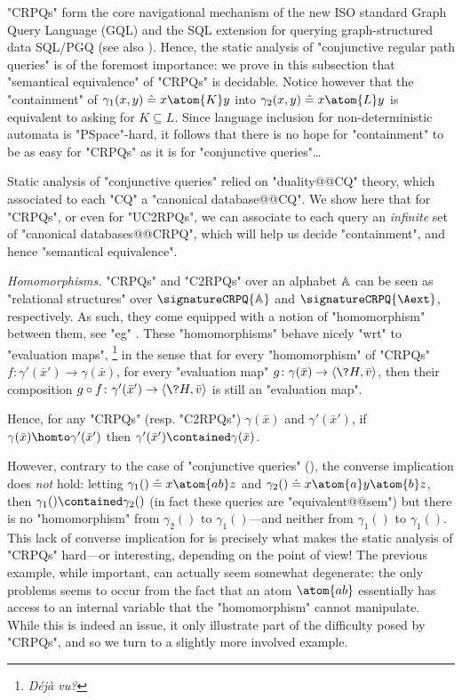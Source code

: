 "CRPQs" form the core navigational mechanism of the new ISO standard Graph Query Language (GQL) \cite{ISO2024GQL} and the SQL extension for querying graph-structured data SQL/PGQ \cite{ISO2023PGQ} (see also \cite{FrancisEtal2023GQL,FrancisEtal2023GPC}).
Hence, the static analysis of "conjunctive regular path queries" is of the foremost
importance: we prove in this subsection that "semantical equivalence" of "CRPQs" is decidable.
Notice however that the "containment" of $\gamma_1(x,y) \defeq x \atom{K} y$
into $\gamma_2(x,y) \defeq x \atom{L} y$ is equivalent to asking for $K \subseteq L$.
Since language inclusion for non-deterministic automata is "PSpace"-hard, it follows
that there is no hope for "containment" to be as easy for "CRPQs" as it is for "conjunctive queries"…

Static analysis of "conjunctive queries" relied on "duality@@CQ" theory,
which associated to each "CQ" a "canonical database@@CQ". 
We show here that for "CRPQs", or even for "UC2RPQs", we can associate
to each query an \emph{infinite} set of "canonical databases@@CRPQ", which will help us
decide "containment", and hence "semantical equivalence".

\emph{Homomorphisms.} "CRPQs" and "C2RPQs" over an alphabet $\mathbb{A}$
can be seen as "relational structures" over $\signatureCRPQ{\A}$ and $\signatureCRPQ{\Aext}$,
respectively. As such, they come equipped with a notion of "homomorphism" between them,
see "eg" . These "homomorphisms" behave nicely "wrt" to "evaluation maps",%
\footnote{\emph{Déjà vu?}}
in the sense that for every "homomorphism" of "CRPQs" $f\colon \gamma'(\bar x') \to \gamma(\bar x)$,
for every "evaluation map" $g\colon \gamma(\bar x) \to \tup{\?H, \bar v}$,
then their composition $g \circ f\colon \gamma'(\bar x') \to \tup{\?H, \bar v}$
is still an "evaluation map".
\begin{fact}
    \label{fact:hom-implies-contained}
    Hence, for any "CRPQs" (resp. "C2RPQs") $\gamma(\bar x)$ and $\gamma'(\bar x')$,
    if $\gamma(\bar x) \homto \gamma'(\bar x')$ then $\gamma'(\bar x') \contained
    \gamma(\bar x)$.
\end{fact}
However, contrary to the case of "conjunctive queries" (),
the converse implication does \emph{not} hold: letting
$\gamma_1() \defeq x \atom{ab} z$ and $\gamma_2() \defeq x \atom{a} y \atom{b} z$,
then $\gamma_1() \contained \gamma_2()$ (in fact these queries are "equivalent@@sem")
but there is no "homomorphism" from $\gamma_2()$ to $\gamma_1()$---and neither
from $\gamma_1()$ to $\gamma_1()$.
This lack of converse implication for   is precisely what
makes the static analysis of "CRPQs" hard---or interesting, depending on the point of view!
The previous example, while important, can actually seem somewhat degenerate: the only problems
seems to occur from the fact that an atom $\atom{ab}$ essentially has access to an
internal variable that the "homomorphism" cannot manipulate.
While this is indeed an issue, it only illustrate part of the difficulty
posed by "CRPQs", and so we turn to a slightly more involved example.

